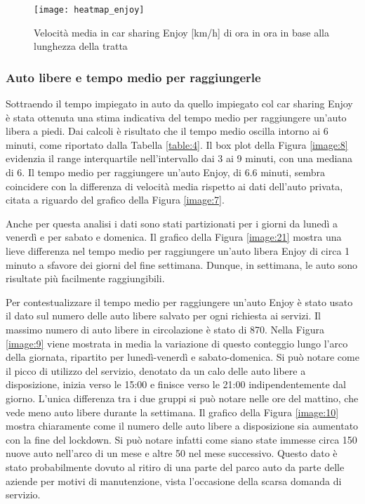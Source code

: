 \begin{figure}
	\centering
	\texttt{[image: heatmap\_enjoy]}
	\caption{Velocità media in car sharing Enjoy [km/h] di ora in ora in base alla lunghezza della tratta}
	\label{image:30}
\end{figure}

\subsubsection{Auto libere e tempo medio per raggiungerle}

Sottraendo il tempo impiegato in auto da quello impiegato col car sharing Enjoy è stata ottenuta una stima indicativa del tempo medio per raggiungere un'auto libera a piedi. Dai calcoli è risultato che il tempo medio oscilla intorno ai 6 minuti, come riportato dalla Tabella \ref{table:4}. Il box plot della Figura \ref{image:8} evidenzia il range interquartile nell'intervallo dai 3 ai 9 minuti, con una mediana di 6. Il tempo medio per raggiungere un'auto Enjoy, di 6.6 minuti, sembra coincidere con la differenza di velocità media rispetto ai dati dell'auto privata, citata a riguardo del grafico della Figura \ref{image:7}.

Anche per questa analisi i dati sono stati partizionati per i giorni da lunedì a venerdì e per sabato e domenica. Il grafico della Figura \ref{image:21} mostra una lieve differenza nel tempo medio per raggiungere un'auto libera Enjoy di circa 1 minuto a sfavore dei giorni del fine settimana. Dunque, in settimana, le auto sono risultate più facilmente raggiungibili.

Per contestualizzare il tempo medio per raggiungere un'auto Enjoy è stato usato il dato sul numero delle auto libere salvato per ogni richiesta ai servizi. Il massimo numero di auto libere in circolazione è stato di 870. Nella Figura \ref{image:9} viene mostrata in media la variazione di questo conteggio lungo l'arco della giornata, ripartito per lunedì-venerdì e sabato-domenica. Si può notare come il picco di utilizzo del servizio, denotato da un calo delle auto libere a disposizione, inizia verso le 15:00 e finisce verso le 21:00 indipendentemente dal giorno. L'unica differenza tra i due gruppi si può notare nelle ore del mattino, che vede meno auto libere durante la settimana. Il grafico della Figura \ref{image:10} mostra chiaramente come il numero delle auto libere a disposizione sia aumentato con la fine del lockdown. Si può notare infatti come siano state immesse circa 150 nuove auto nell'arco di un mese e altre 50 nel mese successivo. Questo dato è stato probabilmente dovuto al ritiro di una parte del parco auto da parte delle aziende per motivi di manutenzione, vista l'occasione della scarsa domanda di servizio.

